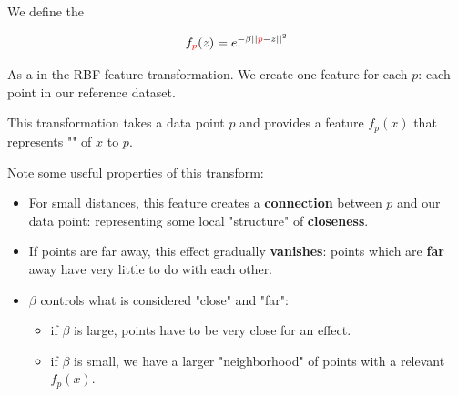             \begin{definition}
                We define the 

                \begin{equation*}
                    f_{ \textcolor{red}{p} }(z) = e^{-\beta ||\textcolor{red}{p}-z||^2 }
                \end{equation*}

                As a  in the RBF feature transformation. We create one feature for each $p$: each point in our reference dataset.

                This transformation takes a data point $p$ and provides a feature $f_p(x)$ that represents "" of $x$ to $p$.
            \end{definition}

            Note some useful properties of this transform:
            \begin{itemize}
                \item For small distances, this feature creates a \textbf{connection} between $p$ and our data point: representing some local "structure" of \textbf{closeness}.
                \item If points are far away, this effect gradually \textbf{vanishes}: points which are \textbf{far} away have very little to do with each other.
                \item $\beta$ controls what is considered "close" and "far": 
                    \begin{itemize}
                        \item if $\beta$ is large, points have to be very close for an effect.
                        \item if $\beta$ is small, we have a larger "neighborhood" of points with a relevant $f_p(x)$.\\
                    \end{itemize}
            \end{itemize}


